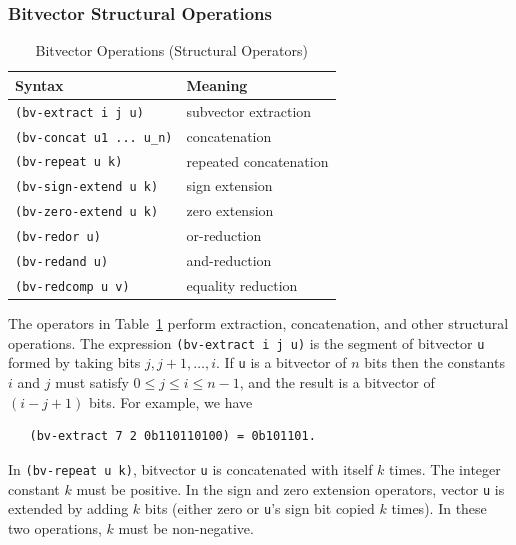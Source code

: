 \documentclass[11pt,twoside,fleqn,openright,titlepage]{cslreport}
\begin{document}
\subsubsection*{Bitvector Structural Operations}

\begin{table}
\begin{small}
\begin{center}
\begin{tabular}{|p{5cm}|l|}
\hline
Syntax & Meaning \\
\hline
\texttt{(bv-extract i j u)} & subvector extraction \\
\texttt{(bv-concat u1 ... u\_n)} & concatenation \\
\texttt{(bv-repeat u k)} & repeated concatenation \\
\texttt{(bv-sign-extend u k)} & sign extension \\
\texttt{(bv-zero-extend u k)} & zero extension \\
\hline
\texttt{(bv-redor u)} & or-reduction \\
\texttt{(bv-redand u)} & and-reduction \\
\texttt{(bv-redcomp u v)} & equality reduction \\
\hline
\end{tabular}
\end{center}
\end{small}
\caption{Bitvector Operations (Structural Operators)}
\label{bitvectors3}
\end{table}

The operators in Table~\ref{bitvectors3} perform extraction,
concatenation, and other structural operations. The expression
\texttt{(bv-extract i j u)} is the segment of bitvector \texttt{u}
formed by taking bits $j, j+1, \ldots, i$. If \texttt{u} is a
bitvector of $n$ bits then the constants $i$ and $j$ must satisfy $0
\leq j \leq i \leq n-1$, and the result is a bitvector of $(i - j +
1)$ bits. For example, we have
\begin{small}
\begin{verbatim}
   (bv-extract 7 2 0b110110100) = 0b101101.
\end{verbatim}
\end{small}

\medskip\noindent
In \texttt{(bv-repeat u k)}, bitvector \texttt{u} is concatenated with
itself $k$ times. The integer constant $k$ must be positive. In the
sign and zero extension operators, vector \texttt{u} is extended by
adding $k$ bits (either zero or \texttt{u}'s sign bit copied $k$
times).  In these two operations, $k$ must be non-negative.
\end{document}
